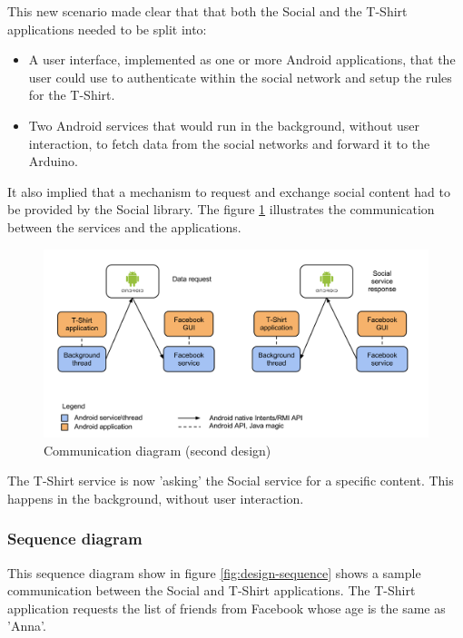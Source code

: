 This new scenario made clear that that both the Social and the T-Shirt applications needed to
be split into:

\begin{itemize}
	\item A user interface, implemented as one or more Android applications, that the user could use to
	authenticate within the social network and setup the rules for the T-Shirt.
	\item Two Android services that would run in the background, without user interaction,
	to fetch data from the social networks and forward it to the Arduino.
\end{itemize}

It also implied that a mechanism to request and exchange social content had to be provided
by the Social library. The figure \ref{fig:design-reqresp} illustrates the communication between
the services and the applications.

\begin{figure}[h!]
	\centering \includegraphics[scale=0.35]{img/design-reqresp.png}
	\caption{Communication diagram (second design)}
	\label{fig:design-reqresp}
\end{figure}

The T-Shirt service is now 'asking' the Social service for a specific content.
This happens in the background, without user interaction.



\subsubsection{Sequence diagram}
This sequence diagram show in figure \ref{fig:design-sequence} shows a sample communication between the Social and T-Shirt applications.
The T-Shirt application requests the list of friends from Facebook whose age is the same as 'Anna'.

